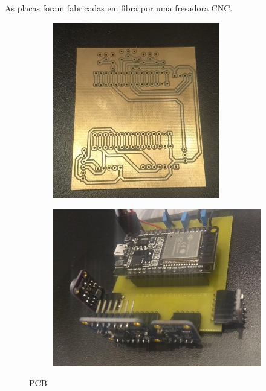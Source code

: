 \documentclass[../monografia.tex]{subfiles}
\begin{document}
As placas foram fabricadas em fibra por uma fresadora CNC.

\begin{figure}[h]
	\centering
	\begin{subfigure}{0.5\textwidth}
		\centering
		\includegraphics[width=0.8\textwidth]{pcb-fresada}
	\end{subfigure}%
	\begin{subfigure}{0.5\textwidth}
		\centering
		\includegraphics[width=1.1\textwidth]{pcb-montada}
	\end{subfigure}
	\caption{PCB}
	\label{fig:mecanicas}
\end{figure}
\end{document}
